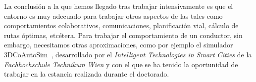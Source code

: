 La conclusión a la que hemos llegado tras trabajar intensivamente es que el entorno es muy adecuado para trabajar otros aspectos de las  tales como comportamientos colaborativos, comunicaciones, planificación vial, cálculo de rutas óptimas, etcétera. Para trabajar el comportamiento de un conductor, sin embargo, necesitamos otras aproximaciones, como por ejemplo el simulador 3DCoAutoSim~\cite{olaverri2018implementation}, desarrollado por el \textit{Intelligent Technologies in Smart Cities} de la \textit{Fachhochschule Technikum Wien} y con el que se ha tenido la oportunidad de trabajar en la estancia realizada durante el doctorado.